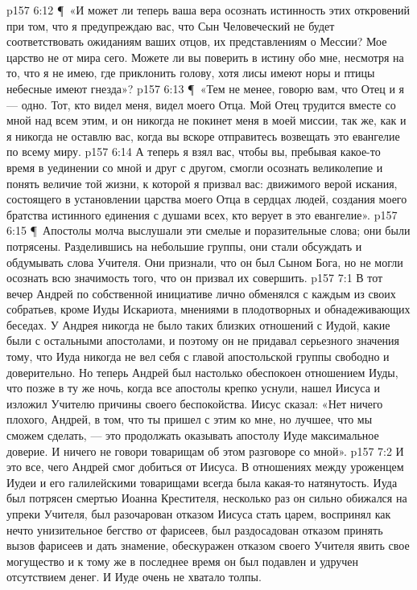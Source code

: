 \vs p157 6:12 \P\ «И может ли теперь ваша вера осознать истинность этих откровений при том, что я предупреждаю вас, что Сын Человеческий не будет соответствовать ожиданиям ваших отцов, их представлениям о Мессии? Мое царство не от мира сего. Можете ли вы поверить в истину обо мне, несмотря на то, что я не имею, где приклонить голову, хотя лисы имеют норы и птицы небесные имеют гнезда»?
\vs p157 6:13 \P\ «Тем не менее, говорю вам, что Отец и я --- одно. Тот, кто видел меня, видел моего Отца. Мой Отец трудится вместе со мной над всем этим, и он никогда не покинет меня в моей миссии, так же, как и я никогда не оставлю вас, когда вы вскоре отправитесь возвещать это евангелие по всему миру.
\vs p157 6:14 А теперь я взял вас, чтобы вы, пребывая какое\hyp{}то время в уединении со мной и друг с другом, смогли осознать великолепие и понять величие той жизни, к которой я призвал вас: движимого верой искания, состоящего в установлении царства моего Отца в сердцах людей, создания моего братства истинного единения с душами всех, кто верует в это евангелие».
\vs p157 6:15 \P\ Апостолы молча выслушали эти смелые и поразительные слова; они были потрясены. Разделившись на небольшие группы, они стали обсуждать и обдумывать слова Учителя. Они признали, что он был Сыном Бога, но не могли осознать всю значимость того, что он призвал их совершить.
\vs p157 7:1 В тот вечер Андрей по собственной инициативе лично обменялся с каждым из своих собратьев, кроме Иуды Искариота, мнениями в плодотворных и обнадеживающих беседах. У Андрея никогда не было таких близких отношений с Иудой, какие были с остальными апостолами, и поэтому он не придавал серьезного значения тому, что Иуда никогда не вел себя с главой апостольской группы свободно и доверительно. Но теперь Андрей был настолько обеспокоен отношением Иуды, что позже в ту же ночь, когда все апостолы крепко уснули, нашел Иисуса и изложил Учителю причины своего беспокойства. Иисус сказал: «Нет ничего плохого, Андрей, в том, что ты пришел с этим ко мне, но лучшее, что мы сможем сделать, --- это продолжать оказывать апостолу Иуде максимальное доверие. И ничего не говори товарищам об этом разговоре со мной».
\vs p157 7:2 И это все, чего Андрей смог добиться от Иисуса. В отношениях между уроженцем Иудеи и его галилейскими товарищами всегда была какая\hyp{}то натянутость. Иуда был потрясен смертью Иоанна Крестителя, несколько раз он сильно обижался на упреки Учителя, был разочарован отказом Иисуса стать царем, воспринял как нечто унизительное бегство от фарисеев, был раздосадован отказом принять вызов фарисеев и дать знамение, обескуражен отказом своего Учителя явить свое могущество и к тому же в последнее время он был подавлен и удручен отсутствием денег. И Иуде очень не хватало толпы.
